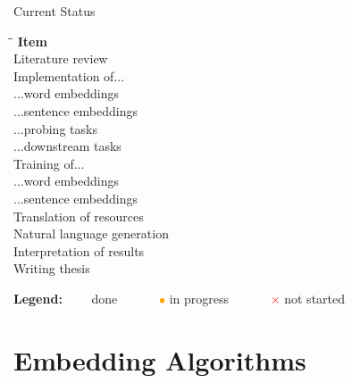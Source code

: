 \documentclass[accentcolor=tud1a,colorbacktitle,inverttitle,landscape,german,presentation,t]{tudbeamer}
\begin{document}
\begin{frame}{Current Status}{}
	\vspace*{-9mm}
	\small
	\begin{center}\parbox{0cm}{
	\begin{tabbing}
		\hspace*{1cm}\=\hspace{5cm}\= \kill
		\textbf{Item} 				\>								\>	\textalign[c]{\textbf{Status}}					\\
		Literature review 				\>								\>	\textalign[c]{\textcolor{orange}{$\bullet$}}		\\
		Implementation of... 			\>								\> 												\\
									\>	...word embeddings			\> 	\textalign[c]{\textcolor{green}{\checkmark}} 	\\
									\>	...sentence embeddings	 	\> 	\textalign[c]{\textcolor{green}{\checkmark}}	\\
									\> 	...probing tasks	 			\> 	\textalign[c]{\textcolor{green}{\checkmark}} 	\\
									\>	...downstream tasks 			\> 	\textalign[c]{\textcolor{green}{\checkmark}} 	\\
		Training of... 				\>								\> 												\\
									\> 	...word embeddings	 		\> 	\textalign[c]{\textcolor{green}{\checkmark}} 	\\
									\>	...sentence embeddings 		\> 	\textalign[c]{\textcolor{green}{\checkmark}} 	\\
		Translation of resources
									\> 								\> 	\textalign[c]{\textcolor{orange}{$\bullet$}} 		\\
		Natural language generation 	\>								\> 	\textalign[c]{\textcolor{red}{$\bm{\times}$}} 	\\
		Interpretation of results		\> 								\>	\textalign[c]{\textcolor{orange}{$\bullet$}} 		\\
		Writing thesis				\> 								\> 	\textalign[c]{\textcolor{orange}{$\bullet$}}
	\end{tabbing}}
	\end{center}
	\textbf{Legend:}~~~~ \textcolor{green}{\checkmark} done~~~~~~ \textcolor{orange}{$\bullet$} in progress~~~~~~
						\textcolor{red}{$\bm{\times}$} not started
\end{frame}


\section{Embedding Algorithms}
\end{document}
